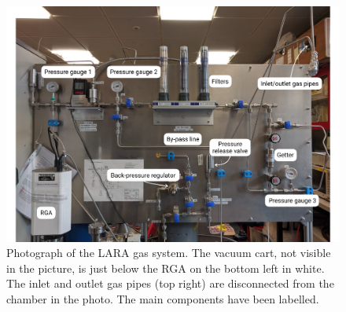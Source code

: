 \documentclass[a4paper,11pt]{article}
\begin{document}
\begin{figure}[tbh]
	\begin{center}
	\includegraphics[width=0.95\linewidth, trim={0cm 0cm 0cm 3cm}, clip=true]{figures/LARA_labels.pdf}		
	\caption{Photograph of the LARA gas system. The vacuum cart, not visible in the picture, is just below the RGA on the bottom left in white. The inlet and outlet gas pipes (top right) are disconnected from the chamber in the photo. The main components have been labelled.}
	\label{fig:LARA_gas_system}
	\end{center}
\end{figure}

\end{document}
